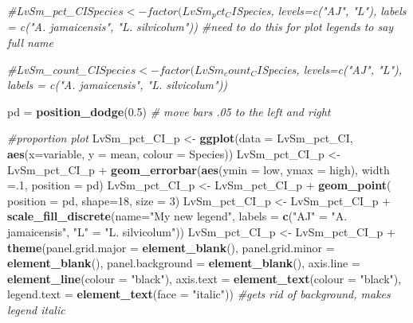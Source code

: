 \documentclass[]{article}
\newenvironment{Shaded}{\begin{snugshade}}{\end{snugshade}}
\newcommand{\KeywordTok}[1]{\textcolor[rgb]{0.13,0.29,0.53}{\textbf{{#1}}}}
\newcommand{\DataTypeTok}[1]{\textcolor[rgb]{0.13,0.29,0.53}{{#1}}}
\newcommand{\DecValTok}[1]{\textcolor[rgb]{0.00,0.00,0.81}{{#1}}}
\newcommand{\FloatTok}[1]{\textcolor[rgb]{0.00,0.00,0.81}{{#1}}}
\newcommand{\StringTok}[1]{\textcolor[rgb]{0.31,0.60,0.02}{{#1}}}
\newcommand{\CommentTok}[1]{\textcolor[rgb]{0.56,0.35,0.01}{\textit{{#1}}}}
\newcommand{\NormalTok}[1]{{#1}}
\begin{document}
\begin{Shaded}
\begin{Highlighting}[]
\CommentTok{#LvSm_pct_CI$Species <- factor(LvSm_pct_CI$Species, levels=c("AJ", "L"), labels = c("A. jamaicensis", "L. silvicolum")) #need to do this for plot legends to say full name}

\CommentTok{#LvSm_count_CI$Species <- factor(LvSm_count_CI$Species, levels=c("AJ", "L"), labels = c("A. jamaicensis", "L. silvicolum"))}


\NormalTok{pd =}\StringTok{ }\KeywordTok{position_dodge}\NormalTok{(}\FloatTok{0.5}\NormalTok{) }\CommentTok{# move bars .05 to the left and right}

\CommentTok{#proportion plot}
\NormalTok{LvSm_pct_CI_p <-}\StringTok{ }\KeywordTok{ggplot}\NormalTok{(}\DataTypeTok{data =} \NormalTok{LvSm_pct_CI, }\KeywordTok{aes}\NormalTok{(}\DataTypeTok{x=}\NormalTok{variable, }\DataTypeTok{y =} \NormalTok{mean, }\DataTypeTok{colour =} \NormalTok{Species))}
\NormalTok{LvSm_pct_CI_p <-}\StringTok{ }\NormalTok{LvSm_pct_CI_p +}\StringTok{ }\KeywordTok{geom_errorbar}\NormalTok{(}\KeywordTok{aes}\NormalTok{(}\DataTypeTok{ymin =} \NormalTok{low, }\DataTypeTok{ymax =} \NormalTok{high), }\DataTypeTok{width =}\NormalTok{.}\DecValTok{1}\NormalTok{, }\DataTypeTok{position =} \NormalTok{pd)}
\NormalTok{LvSm_pct_CI_p <-}\StringTok{ }\NormalTok{LvSm_pct_CI_p +}\StringTok{ }\KeywordTok{geom_point}\NormalTok{( }\DataTypeTok{position =} \NormalTok{pd, }\DataTypeTok{shape=}\DecValTok{18}\NormalTok{, }\DataTypeTok{size =} \DecValTok{3}\NormalTok{)}
\NormalTok{LvSm_pct_CI_p <-}\StringTok{ }\NormalTok{LvSm_pct_CI_p +}\StringTok{ }\KeywordTok{scale_fill_discrete}\NormalTok{(}\DataTypeTok{name=}\StringTok{"My new legend"}\NormalTok{, }\DataTypeTok{labels =} \KeywordTok{c}\NormalTok{(}\StringTok{"AJ"} \NormalTok{=}\StringTok{ "A. jamaicensis"}\NormalTok{, }\StringTok{"L"} \NormalTok{=}\StringTok{ "L. silvicolum"}\NormalTok{)) }
\NormalTok{LvSm_pct_CI_p <-}\StringTok{ }\NormalTok{LvSm_pct_CI_p +}\StringTok{ }\KeywordTok{theme}\NormalTok{(}\DataTypeTok{panel.grid.major =} \KeywordTok{element_blank}\NormalTok{(), }\DataTypeTok{panel.grid.minor =} \KeywordTok{element_blank}\NormalTok{(),}
\DataTypeTok{panel.background =} \KeywordTok{element_blank}\NormalTok{(), }\DataTypeTok{axis.line =} \KeywordTok{element_line}\NormalTok{(}\DataTypeTok{colour =} \StringTok{"black"}\NormalTok{), }\DataTypeTok{axis.text =} \KeywordTok{element_text}\NormalTok{(}\DataTypeTok{colour =} \StringTok{"black"}\NormalTok{), }\DataTypeTok{legend.text =} \KeywordTok{element_text}\NormalTok{(}\DataTypeTok{face =} \StringTok{"italic"}\NormalTok{))  }\CommentTok{#gets rid of background, makes legend italic}


\end{Highlighting}
\end{Shaded}
\end{document}
